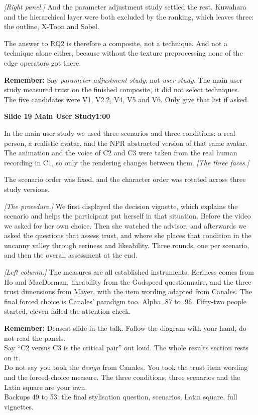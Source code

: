 \documentclass[11pt,a4paper]{article}
\newcommand{\slidehead}[3]{%
  \needspace{5\baselineskip}
  \vspace{0.9em}
  \noindent\colorbox{knblue}{\parbox{0.978\textwidth}{\vspace{1pt}\color{white}\textbf{Slide #1 \quad #2}\hfill\textbf{#3}\vspace{1pt}}}
  \vspace{0.35em}\par}
\newcommand{\remind}[1]{%
  \vspace{0.15em}
  \noindent\colorbox{knlight}{\parbox{0.972\textwidth}{\small\color{knblue}\textbf{Remember:} #1}}
  \vspace{0.2em}\par}
\newcommand{\pointto}[1]{{\color{knaccent}\textit{[#1]}}}
\begin{document}
\pointto{Right panel.} And the parameter adjustment study settled the rest. Kuwahara and the hierarchical layer were both excluded by the ranking, which leaves three: the outline, X-Toon and Sobel.

The answer to RQ2 is therefore a composite, not a technique. And not a technique alone either, because without the texture preprocessing none of the edge operators got there.

\remind{Say \emph{parameter adjustment study}, not \emph{user study}. The main user study measured trust on the finished composite, it did not select techniques.\\[0.4em] The five candidates were V1, V2.2, V4, V5 and V6. Only give that list if asked.}

\slidehead{19}{Main User Study}{1:00}

In the main user study we used three scenarios and three conditions: a real person, a realistic avatar, and the NPR abstracted version of that same avatar. The animation and the voice of C2 and C3 were taken from the real human recording in C1, so only the rendering changes between them. \pointto{The three faces.}

The scenario order was fixed, and the character order was rotated across three study versions.

\pointto{The procedure.} We first displayed the decision vignette, which explains the scenario and helps the participant put herself in that situation. Before the video we asked for her own choice. Then she watched the advisor, and afterwards we asked the questions that assess trust, and where she places that condition in the uncanny valley through eeriness and likeability. Three rounds, one per scenario, and then the overall assessment at the end.

\pointto{Left column.} The measures are all established instruments. Eeriness comes from Ho and MacDorman, likeability from the Godspeed questionnaire, and the three trust dimensions from Mayer, with the item wording adapted from Canales. The final forced choice is Canales' paradigm too. Alpha .87 to .96. Fifty-two people started, eleven failed the attention check.

\remind{Densest slide in the talk. Follow the diagram with your hand, do not read the panels.\\[0.4em] Say ``C2 versus C3 is the critical pair'' out loud. The whole results section rests on it.\\[0.4em] Do not say you took the \emph{design} from Canales. You took the trust item wording and the forced-choice measure. The three conditions, three scenarios and the Latin square are your own.\\[0.4em] Backups 49 to 53: the final stylisation question, scenarios, Latin square, full vignettes.}
\end{document}
